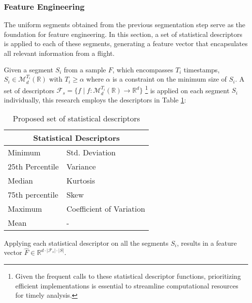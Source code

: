 \documentclass{IEEEtran}
\begin{document}
            \subsubsection{Feature Engineering}

                The uniform segments obtained from the previous segmentation step serve as the foundation for feature engineering. In this section, a set of statistical descriptors is applied to each of these segments, generating a feature vector that encapsulates all relevant information from a flight.

                Given a segment $S_{i}$ from a sample $F$, which encompasses $T_i$ timestamps, $S_i \in \mathcal{M}_{d}^{T_i}(\mathbb{R})$ with $T_i \geq \alpha$ where $\alpha$ is a constraint on the minimum size of $S_i$. A set of descriptors $\mathcal{F}_s = \{f \mid  f: \mathcal{M}_{d}^{T_i}(\mathbb{R}) \rightarrow \mathbb{R}^{d}\}$ \footnote{Given the frequent calls to these statistical descriptor functions, prioritizing efficient implementations is essential to streamline computational resources for timely analysis.} is applied on each segment $S_i$ individually, this research employs the descriptors in Table \ref{tab:stat_descriptors}:
                \begin{table}[!htbp]
                    \centering
                    \caption{Proposed set of statistical descriptors}
                    \label{tab:stat_descriptors}
                    \begin{tabular}{ll}
                        \toprule
                        \multicolumn{2}{c}{Statistical Descriptors} \\
                        \midrule
                        Minimum & Std. Deviation \\
                        25th Percentile & Variance \\
                        Median & Kurtosis \\
                        75th percentile & Skew \\
                        Maximum & Coefficient of Variation \\
                        Mean & - \\
                        \bottomrule
                    \end{tabular}
                \end{table}

                Applying each statistical descriptor on all the segments $S_i$, results in a feature vector $\hat{F} \in \mathbb{R}^{d \cdot |\mathcal{F}_s| \cdot |S| }$.
\end{document}
